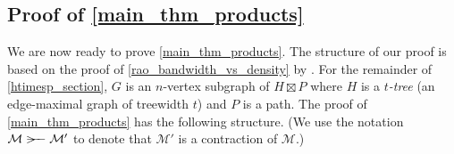 \documentclass{patmorin}
\renewcommand{\ge}{\geqslant}
\newcommand{\defin}[1]{\emph{\textcolor{brightmaroon}{#1}}}
\DeclareMathOperator{\diam}{diam}
\begin{document}
%
%
%

\subsection{Proof of \cref{main_thm_products}}

We are now ready to prove \cref{main_thm_products}. The structure of our proof is based on the proof of \cref{rao_bandwidth_vs_density} by \citet{rao:small}.
For the remainder of \cref{htimesp_section}, $G$ is an $n$-vertex subgraph of $H\boxtimes P$ where $H$ is a \defin{$t$-tree} (an edge-maximal graph of treewidth $t$) and $P$ is a path.  The proof of \cref{main_thm_products} has the following structure. (We use the notation $\mathcal{M}\rightbroom\mathcal{M'}$ to denote that $\mathcal{M}'$ is a contraction of $\mathcal{M}$.)
\end{document}
